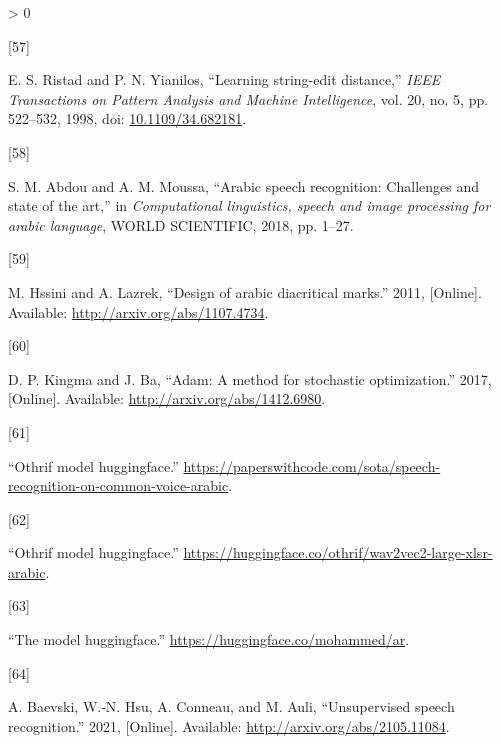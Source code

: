 \documentclass[
  a4paper,
]{article}
\newlength{\cslhangindent}
\newlength{\csllabelwidth}
\newenvironment{CSLReferences}[2] %
 {%
  \setlength{\parindent}{0pt}
  \ifodd #1 \everypar{\setlength{\hangindent}{\cslhangindent}}\ignorespaces\fi
  \ifnum #2 > 0
  \setlength{\parskip}{#2\baselineskip}
  \fi
 }%
 {}
\newcommand{\CSLLeftMargin}[1]{\parbox[t]{\csllabelwidth}{#1}}
\newcommand{\CSLRightInline}[1]{\parbox[t]{\linewidth - \csllabelwidth}{#1}\break}
\begin{document}
\begin{CSLReferences}{0}{0}
\leavevmode\hypertarget{ref-682181}{}%
\CSLLeftMargin{{[}57{]} }
\CSLRightInline{E. S. Ristad and P. N. Yianilos, {``Learning string-edit
distance,''} \emph{IEEE Transactions on Pattern Analysis and Machine
Intelligence}, vol. 20, no. 5, pp. 522--532, 1998, doi:
\href{https://doi.org/10.1109/34.682181}{10.1109/34.682181}.}

\leavevmode\hypertarget{ref-Abdou_Moussa_2018}{}%
\CSLLeftMargin{{[}58{]} }
\CSLRightInline{S. M. Abdou and A. M. Moussa, {``Arabic speech
recognition: Challenges and state of the art,''} in \emph{Computational
linguistics, speech and image processing for arabic language}, WORLD
SCIENTIFIC, 2018, pp. 1--27.}

\leavevmode\hypertarget{ref-hssini2011design}{}%
\CSLLeftMargin{{[}59{]} }
\CSLRightInline{M. Hssini and A. Lazrek, {``Design of arabic diacritical
marks.''} 2011, {[}Online{]}. Available:
\url{http://arxiv.org/abs/1107.4734}.}

\leavevmode\hypertarget{ref-kingma2017adam}{}%
\CSLLeftMargin{{[}60{]} }
\CSLRightInline{D. P. Kingma and J. Ba, {``Adam: A method for stochastic
optimization.''} 2017, {[}Online{]}. Available:
\url{http://arxiv.org/abs/1412.6980}.}

\leavevmode\hypertarget{ref-paperswithcode}{}%
\CSLLeftMargin{{[}61{]} }
\CSLRightInline{{``Othrif model huggingface.''}
\url{https://paperswithcode.com/sota/speech-recognition-on-common-voice-arabic}.}

\leavevmode\hypertarget{ref-Huggingface_othrif}{}%
\CSLLeftMargin{{[}62{]} }
\CSLRightInline{{``Othrif model huggingface.''}
\url{https://huggingface.co/othrif/wav2vec2-large-xlsr-arabic}.}

\leavevmode\hypertarget{ref-themodel}{}%
\CSLLeftMargin{{[}63{]} }
\CSLRightInline{{``The model huggingface.''}
\url{https://huggingface.co/mohammed/ar}.}

\leavevmode\hypertarget{ref-baevski2021unsupervised}{}%
\CSLLeftMargin{{[}64{]} }
\CSLRightInline{A. Baevski, W.-N. Hsu, A. Conneau, and M. Auli,
{``Unsupervised speech recognition.''} 2021, {[}Online{]}. Available:
\url{http://arxiv.org/abs/2105.11084}.}

\end{CSLReferences}
\end{document}
